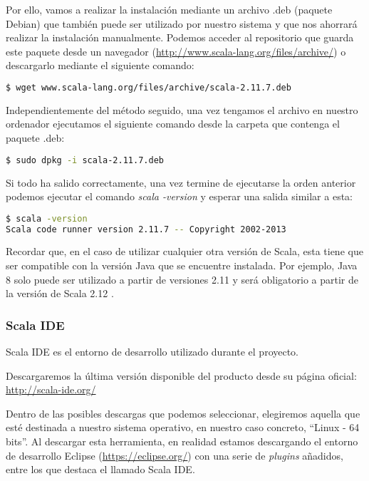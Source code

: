 Por ello, vamos a realizar la instalación mediante un archivo .deb (paquete Debian) que también puede ser utilizado por nuestro sistema y que nos ahorrará realizar la instalación manualmente. Podemos acceder al repositorio que guarda este paquete desde un navegador (\url{http://www.scala-lang.org/files/archive/}) o descargarlo mediante el siguiente comando:

\begin{lstlisting}[language=bash]
$ wget www.scala-lang.org/files/archive/scala-2.11.7.deb
\end{lstlisting}

Independientemente del método seguido, una vez tengamos el archivo en nuestro ordenador ejecutamos el siguiente comando desde la carpeta que contenga el paquete .deb:

\begin{lstlisting}[language=bash]
$ sudo dpkg -i scala-2.11.7.deb
\end{lstlisting}

Si todo ha salido correctamente, una vez termine de ejecutarse la orden anterior podemos ejecutar el comando \textit{scala -version} y esperar una salida similar a esta:

\begin{lstlisting}[language=bash]
$ scala -version
Scala code runner version 2.11.7 -- Copyright 2002-2013
\end{lstlisting}

Recordar que, en el caso de utilizar cualquier otra versión de Scala, esta tiene que ser compatible con la versión Java que se encuentre instalada. Por ejemplo, Java 8 solo puede ser utilizado a partir de versiones 2.11 y será obligatorio a partir de la versión de Scala 2.12 \cite{Scala2.12Roadmap}. 

\subsubsection{Scala IDE}

Scala IDE es el entorno de desarrollo utilizado durante el proyecto.

Descargaremos la  última versión disponible del producto desde su página oficial: \url{http://scala-ide.org/}

Dentro de las posibles descargas que podemos seleccionar, elegiremos aquella que esté destinada a nuestro sistema operativo, en nuestro caso concreto, ``Linux - 64 bits''. Al descargar esta herramienta, en realidad estamos descargando el entorno de desarrollo Eclipse (\url{https://eclipse.org/}) con una serie de \textit{plugins} añadidos, entre los que destaca el llamado Scala IDE.

